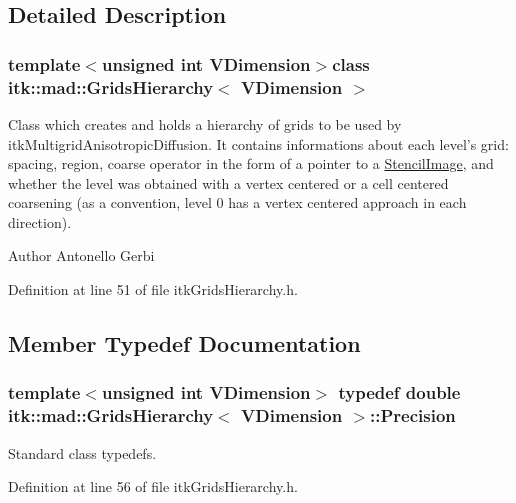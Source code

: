 \subsection{Detailed Description}
\subsubsection*{template$<$unsigned int V\-Dimension$>$class itk\-::mad\-::\-Grids\-Hierarchy$<$ V\-Dimension $>$}

Class which creates and holds a hierarchy of grids to be used by itk\-Multigrid\-Anisotropic\-Diffusion. It contains informations about each level's grid\-: spacing, region, coarse operator in the form of a pointer to a \hyperlink{classitk_1_1mad_1_1_stencil_image}{Stencil\-Image}, and whether the level was obtained with a vertex centered or a cell centered coarsening (as a convention, level 0 has a vertex centered approach in each direction). 

\begin{DoxyAuthor}{Author}
Antonello Gerbi 
\end{DoxyAuthor}


Definition at line 51 of file itk\-Grids\-Hierarchy.\-h.



\subsection{Member Typedef Documentation}
\hypertarget{classitk_1_1mad_1_1_grids_hierarchy_a235005f48422caf216820d2d6b77ca0a}{
\subsubsection[{Precision}]{\setlength{\rightskip}{0pt plus 5cm}template$<$unsigned int V\-Dimension$>$ typedef double {\bf itk\-::mad\-::\-Grids\-Hierarchy}$<$ V\-Dimension $>$\-::{\bf Precision}}}\label{classitk_1_1mad_1_1_grids_hierarchy_a235005f48422caf216820d2d6b77ca0a}
Standard class typedefs. 

Definition at line 56 of file itk\-Grids\-Hierarchy.\-h.



